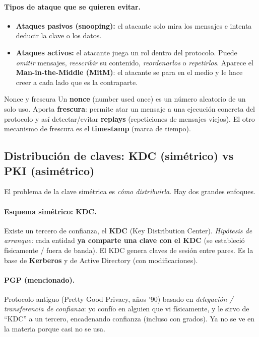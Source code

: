 \documentclass[../main.tex]{subfiles}
\begin{document}
\paragraph{Tipos de ataque que se quieren evitar.}
\begin{itemize}[leftmargin=1.4em]
  \item \textbf{Ataques pasivos (snooping):} el atacante solo mira los mensajes e
  intenta deducir la clave o los datos.
  \item \textbf{Ataques activos:} el atacante juega un rol dentro del protocolo.
  Puede \emph{omitir} mensajes, \emph{reescribir} su contenido, \emph{reordenarlos}
  o \emph{repetirlos}. Aparece el \textbf{Man-in-the-Middle (MitM)}: el atacante se
  para en el medio y le hace creer a cada lado que es la contraparte.
\end{itemize}

\begin{definicion}{Nonce y frescura}
Un \textbf{nonce} (number used once) es un número aleatorio de un solo uso. Aporta
\textbf{frescura}: permite atar un mensaje a una ejecución concreta del protocolo y
así detectar/evitar \textbf{replays} (repeticiones de mensajes viejos). El otro
mecanismo de frescura es el \textbf{timestamp} (marca de tiempo).
\end{definicion}

\subsection{Distribución de claves: KDC (simétrico) vs PKI (asimétrico)}

El problema de la clave simétrica es \emph{cómo distribuirla}. Hay dos grandes
enfoques.

\paragraph{Esquema simétrico: KDC.} Existe un tercero de confianza, el
\textbf{KDC} (Key Distribution Center). \emph{Hipótesis de arranque:} cada entidad
\textbf{ya comparte una clave con el KDC} (se estableció físicamente / fuera de
banda). El KDC genera claves de sesión entre pares. Es la base de \textbf{Kerberos}
y de Active Directory (con modificaciones).

\paragraph{PGP (mencionado).} Protocolo antiguo (Pretty Good Privacy, años '90)
basado en \emph{delegación / transferencia de confianza}: yo confío en alguien que
vi físicamente, y le sirvo de ``KDC'' a un tercero, encadenando confianza (incluso
con grados). Ya no se ve en la materia porque casi no se usa.
\end{document}
